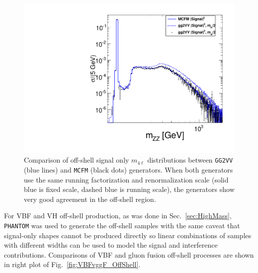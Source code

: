 \begin{figure}[htbp]
\begin{center}
\includegraphics[width=.5\linewidth]{HiggsProperties/figures/gg2VVvsMCFM.pdf}
\caption[Comparison of Off-shell Differential Cross Section between gg2VV and MCFM]{Comparison of off-shell signal only $m_{4\ell}$ distributions between {\tt GG2VV} (blue lines) and {\tt MCFM} (black dots) generators. When both generators use the same running factorization and renormalization scale (solid blue is fixed scale, dashed blue is running scale), the generators show very good agreement in the off-shell region.}
\label{fig:gg2VVMCFMComparison}
\end{center}
\end{figure}

For VBF and VH off-shell production, as was done in Sec.~\ref{sec:HighMass}, {\tt PHANTOM} was used to generate the off-shell samples with the same caveat that signal-only shapes cannot be produced directly so linear combinations of samples with different widths can be used to model the signal and interference contributions. Comparisons of VBF and gluon fusion off-shell processes are shown in right plot of Fig.~\ref{fig:VBFvggF_OffShell}.

